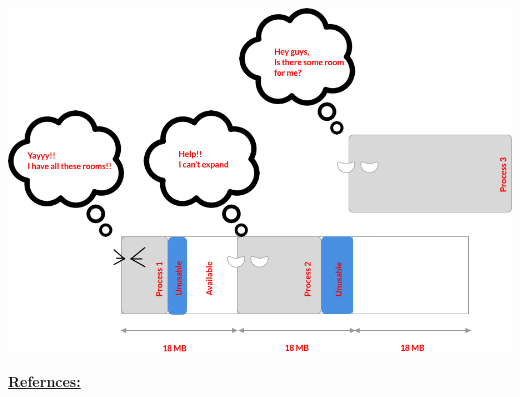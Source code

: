 \documentclass[12pt]{article}
\begin{document}
\begin{itemize}
    \begin{center}
    \includegraphics[width=0.8\linewidth]{images/week_5_notes_1_1.png}
    \end{center}

    \bigskip

    \underline{\textbf{Refernces:}}

    \bigskip


\end{itemize}
\end{document}
